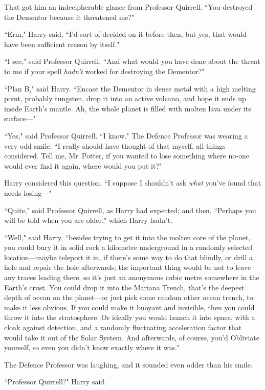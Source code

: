 That got him an indecipherable glance from Professor Quirrell. ``You destroyed the Dementor because it threatened me?"

``Erm," Harry said, ``I'd sort of decided on it before then, but yes, that would have been sufficient reason by itself."

``I see," said Professor Quirrell. ``And what would you have done about the threat to me if your spell \emph{hadn't} worked for destroying the Dementor?"

``Plan B," said Harry. ``Encase the Dementor in dense metal with a high melting point, probably tungsten, drop it into an active volcano, and hope it ends up inside Earth's mantle. Ah, the whole planet is filled with molten lava under its surface—"

``Yes," said Professor Quirrell. ``I know." The Defence Professor was wearing a very odd smile. ``I really should have thought of that myself, all things considered. Tell me, Mr~Potter, if you wanted to lose something where no-one would ever find it again, where would you put it?"

Harry considered this question. ``I suppose I shouldn't ask \emph{what} you've found that needs losing—"

``Quite," said Professor Quirrell, as Harry had expected; and then, ``Perhaps you will be told when you are older," which Harry hadn't.

``Well," said Harry, ``besides trying to get it into the molten core of the planet, you could bury it in solid rock a kilometre underground in a randomly selected location—maybe teleport it in, if there's some way to do that blindly, or drill a hole and repair the hole afterwards; the important thing would be not to leave any traces leading there, so it's just an anonymous cubic metre somewhere in the Earth's crust. You could drop it into the Mariana Trench, that's the deepest depth of ocean on the planet—or just pick some random other ocean trench, to make it less obvious. If you could make it buoyant and invisible, then you could throw it into the stratosphere. Or ideally you would launch it into space, with a cloak against detection, and a randomly fluctuating acceleration factor that would take it out of the Solar System. And afterwards, of course, you'd Obliviate yourself, so even you didn't know exactly where it was."

The Defence Professor was laughing, and it sounded even odder than his smile.

``Professor Quirrell?" Harry said.

